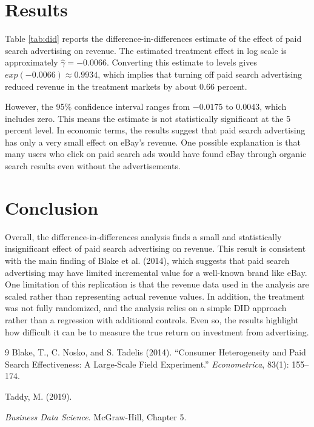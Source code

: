 \documentclass[12pt]{article}
\begin{document}
\section{Results}






Table \ref{tab:did} reports the difference-in-differences estimate of the effect of paid search advertising on revenue. The estimated treatment effect in log scale is approximately $\hat{\gamma} = -0.0066$. Converting this estimate to levels gives $exp(-0.0066) \approx 0.9934$, which implies that turning off paid search advertising reduced revenue in the treatment markets by about 0.66 percent.

However, the 95\% confidence interval ranges from $-0.0175$ to $0.0043$, which includes zero. This means the estimate is not statistically significant at the 5 percent level. In economic terms, the results suggest that paid search advertising has only a very small effect on eBay’s revenue. One possible explanation is that many users who click on paid search ads would have found eBay through organic search results even without the advertisements.

\section{Conclusion}

Overall, the difference-in-differences analysis finds a small and statistically insignificant effect of paid search advertising on revenue. This result is consistent with the main finding of Blake et al. (2014), which suggests that paid search advertising may have limited incremental value for a well-known brand like eBay. One limitation of this replication is that the revenue data used in the analysis are scaled rather than representing actual revenue values. In addition, the treatment was not fully randomized, and the analysis relies on a simple DID approach rather than a regression with additional controls. Even so, the results highlight how difficult it can be to measure the true return on investment from advertising.


\begin{thebibliography}{9}
Blake, T., C. Nosko, and S. Tadelis (2014).
``Consumer Heterogeneity and Paid Search Effectiveness: A Large-Scale Field Experiment.''
\textit{Econometrica}, 83(1): 155--174.

Taddy, M. (2019).

\textit{Business Data Science}. McGraw-Hill, Chapter 5.
\end{thebibliography}
\end{document}
